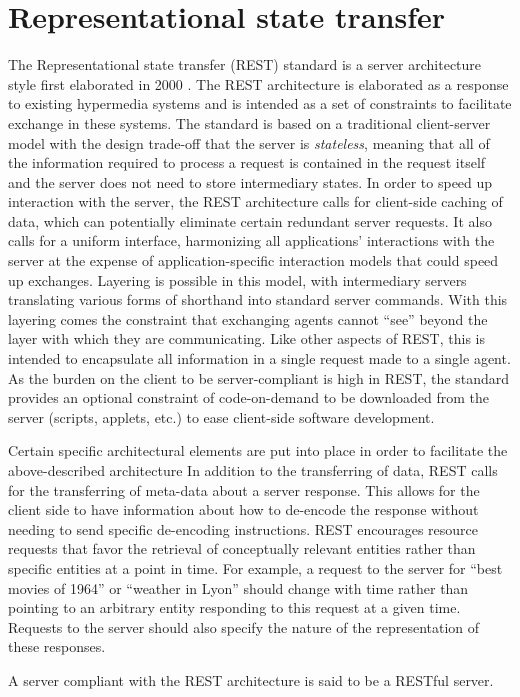 \documentclass{article}
\begin{document}
\section{Representational state transfer}
The Representational state transfer (REST) standard is a server architecture style first elaborated in 2000 \cite{Fielding00}.  The REST architecture is elaborated as a response to existing hypermedia systems and is intended as a set of constraints to facilitate exchange in these systems.  The standard is based on a traditional client-server model with the design trade-off that the server is \emph{stateless}, meaning that all of the information required to process a request is contained in the request itself and the server does not need to store intermediary states.  In order to speed up interaction with the server, the REST architecture calls for client-side caching of data, which can potentially eliminate certain redundant server requests.  It also calls for a uniform interface, harmonizing all applications' interactions with the server at the expense of application-specific interaction models that could speed up exchanges.  Layering is possible in this model, with intermediary servers translating various forms of shorthand into standard server commands.  With this layering comes the constraint that exchanging agents cannot ``see'' beyond the layer with which they are communicating.  Like other aspects of REST, this is intended to encapsulate all information in a single request made to a single agent.  As the burden on the client to be server-compliant is high in REST, the standard provides an optional constraint of code-on-demand to be downloaded from the server (scripts, applets, etc.) to ease client-side software development.\par
Certain specific architectural elements are put into place in order to facilitate the above-described architecture  In addition to the transferring of data, REST calls for the transferring of meta-data about a server response.  This allows for the client side to have information about how to de-encode the response without needing to send specific de-encoding instructions.  REST encourages resource requests that favor the retrieval of conceptually relevant entities rather than specific entities at a point in time.  For example, a request to the server for ``best movies of 1964'' or ``weather in Lyon'' should change with time rather than pointing to an arbitrary entity responding to this request at a given time.  Requests to the server should also specify the nature of the representation of these responses.\par
A server compliant with the REST architecture is said to be a RESTful server.
\end{document}
